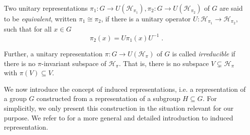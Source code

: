 \documentclass[pdflatex,sn-mathphys-num]{sn-jnl}
\theoremstyle{thmstyletwo}
\theoremstyle{thmstyleone}
\theoremstyle{thmstyletwo}
\begin{document}
     Two unitary representations $\pi_1: G \to U(\mathcal{H}_{\pi_1}), \pi_2: G \to U(\mathcal{H}_{\pi_2})$ of $G$ are said to be \textit{equivalent}, written $\pi_1 \cong \pi_2$, if there is a unitary operator $U: \mathcal{H}_{\pi_1} \to \mathcal{H}_{\pi_2}$, such that for all $x \in G$
    \[\pi_2(x) = U\pi_1(x)U^{-1} \;.\]

    Further, a unitary representation $\pi: G \to U(\mathcal{H}_{\pi})$ of $G$ is called \textit{irreducible} if there is no $\pi$-invariant subspace of $\mathcal{H}_{\pi}$. That is, there is no subspace $V \subsetneq \mathcal{H}_{\pi}$ with $\pi(V) \subseteq V$.
    
	We now introduce the concept of induced representations, i.e. a representation of a group $G$ constructed from a representation of a subgroup $H \subseteq G$. For simplicitly, we only present this construction in the situation relevant for our purpose. We refer to \cite{folland2015course} for a more general and detailed introduction to induced representation.
	
\end{document}
